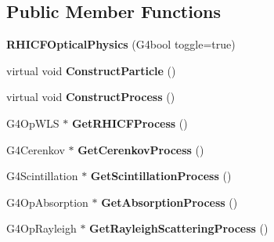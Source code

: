 \subsection*{Public Member Functions}
\begin{DoxyCompactItemize}
\item 
\hypertarget{class_r_h_i_c_f_optical_physics_a4e4d3f7d099e55bee93c1d0bdae100f2}{}{\bfseries R\+H\+I\+C\+F\+Optical\+Physics} (G4bool toggle=true)\label{class_r_h_i_c_f_optical_physics_a4e4d3f7d099e55bee93c1d0bdae100f2}

\item 
\hypertarget{class_r_h_i_c_f_optical_physics_adf633ad46bfadaf066b1d6aa32f422ee}{}virtual void {\bfseries Construct\+Particle} ()\label{class_r_h_i_c_f_optical_physics_adf633ad46bfadaf066b1d6aa32f422ee}

\item 
\hypertarget{class_r_h_i_c_f_optical_physics_a0ee71df377c8ba3b044bc837562934c6}{}virtual void {\bfseries Construct\+Process} ()\label{class_r_h_i_c_f_optical_physics_a0ee71df377c8ba3b044bc837562934c6}

\item 
\hypertarget{class_r_h_i_c_f_optical_physics_aa4427e0bee465f18b892fdd25004eee1}{}G4\+Op\+W\+L\+S $\ast$ {\bfseries Get\+R\+H\+I\+C\+F\+Process} ()\label{class_r_h_i_c_f_optical_physics_aa4427e0bee465f18b892fdd25004eee1}

\item 
\hypertarget{class_r_h_i_c_f_optical_physics_adfd9cd4490bf681b51e5ccd3864a80db}{}G4\+Cerenkov $\ast$ {\bfseries Get\+Cerenkov\+Process} ()\label{class_r_h_i_c_f_optical_physics_adfd9cd4490bf681b51e5ccd3864a80db}

\item 
\hypertarget{class_r_h_i_c_f_optical_physics_a4d3e5ed27a61fcd814cf791739d7ad51}{}G4\+Scintillation $\ast$ {\bfseries Get\+Scintillation\+Process} ()\label{class_r_h_i_c_f_optical_physics_a4d3e5ed27a61fcd814cf791739d7ad51}

\item 
\hypertarget{class_r_h_i_c_f_optical_physics_aad6f5d100c840c6cf85615c8e29a8973}{}G4\+Op\+Absorption $\ast$ {\bfseries Get\+Absorption\+Process} ()\label{class_r_h_i_c_f_optical_physics_aad6f5d100c840c6cf85615c8e29a8973}

\item 
\hypertarget{class_r_h_i_c_f_optical_physics_abdc3735a932b50ddcc8e071cde091e11}{}G4\+Op\+Rayleigh $\ast$ {\bfseries Get\+Rayleigh\+Scattering\+Process} ()\label{class_r_h_i_c_f_optical_physics_abdc3735a932b50ddcc8e071cde091e11}


\end{DoxyCompactItemize}
